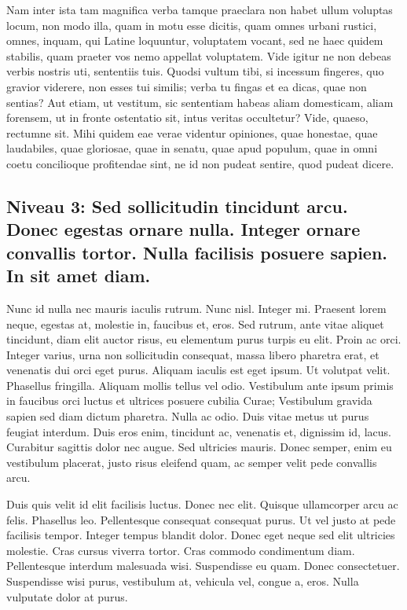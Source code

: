 \documentclass[twoside]{extreport}
\begin{document}
Nam inter ista tam magnifica verba tamque praeclara non habet ullum
voluptas locum, non modo illa, quam in motu esse dicitis, quam omnes
urbani rustici, omnes, inquam, qui Latine loquuntur, voluptatem vocant,
sed ne haec quidem stabilis, quam praeter vos nemo appellat voluptatem.
Vide igitur ne non debeas verbis nostris uti, sententiis tuis. Quodsi
vultum tibi, si incessum fingeres, quo gravior viderere, non esses tui
similis; verba tu fingas et ea dicas, quae non sentias? Aut etiam, ut
vestitum, sic sententiam habeas aliam domesticam, aliam forensem, ut in
fronte ostentatio sit, intus veritas occultetur? Vide, quaeso, rectumne
sit. Mihi quidem eae verae videntur opiniones, quae honestae, quae
laudabiles, quae gloriosae, quae in senatu, quae apud populum, quae in
omni coetu concilioque profitendae sint, ne id non pudeat sentire, quod
pudeat dicere.

\hypertarget{niveau-3-sed-sollicitudin-tincidunt-arcu.-donec-egestas-ornare-nulla.-integer-ornare-convallis-tortor.-nulla-facilisis-posuere-sapien.-in-sit-amet-diam.}{%
\subsection{Niveau 3: Sed sollicitudin tincidunt arcu. Donec egestas
ornare nulla. Integer ornare convallis tortor. Nulla facilisis posuere
sapien. In sit amet
diam.}\label{niveau-3-sed-sollicitudin-tincidunt-arcu.-donec-egestas-ornare-nulla.-integer-ornare-convallis-tortor.-nulla-facilisis-posuere-sapien.-in-sit-amet-diam.}}

Nunc id nulla nec mauris iaculis rutrum. Nunc nisl. Integer mi. Praesent
lorem neque, egestas at, molestie in, faucibus et, eros. Sed rutrum,
ante vitae aliquet tincidunt, diam elit auctor risus, eu elementum purus
turpis eu elit. Proin ac orci. Integer varius, urna non sollicitudin
consequat, massa libero pharetra erat, et venenatis dui orci eget purus.
Aliquam iaculis est eget ipsum. Ut volutpat velit. Phasellus fringilla.
Aliquam mollis tellus vel odio. Vestibulum ante ipsum primis in faucibus
orci luctus et ultrices posuere cubilia Curae; Vestibulum gravida sapien
sed diam dictum pharetra. Nulla ac odio. Duis vitae metus ut purus
feugiat interdum. Duis eros enim, tincidunt ac, venenatis et, dignissim
id, lacus. Curabitur sagittis dolor nec augue. Sed ultricies mauris.
Donec semper, enim eu vestibulum placerat, justo risus eleifend quam, ac
semper velit pede convallis arcu.

Duis quis velit id elit facilisis luctus. Donec nec elit. Quisque
ullamcorper arcu ac felis. Phasellus leo. Pellentesque consequat
consequat purus. Ut vel justo at pede facilisis tempor. Integer tempus
blandit dolor. Donec eget neque sed elit ultricies molestie. Cras cursus
viverra tortor. Cras commodo condimentum diam. Pellentesque interdum
malesuada wisi. Suspendisse eu quam. Donec consectetuer. Suspendisse
wisi purus, vestibulum at, vehicula vel, congue a, eros. Nulla vulputate
dolor at purus.
\end{document}
